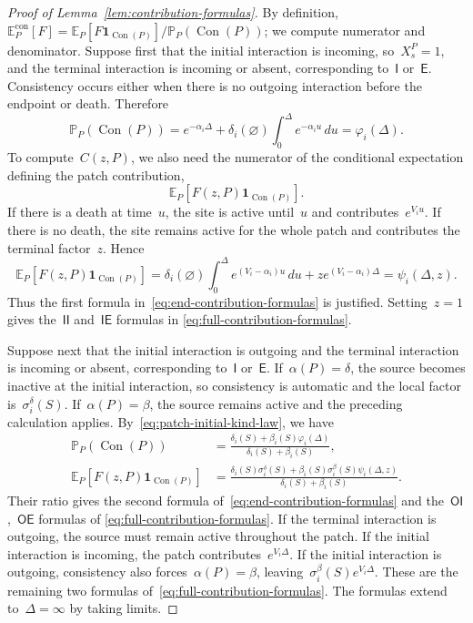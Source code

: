 \documentclass[EJP,preprint,NODS,nobera]{ejpecp}
\newcommand{\pP}{\mathbb{P}}
\newcommand{\E}{\mathbb{E}}
\newcommand{\bb}[1]{\left(#1\right)}
\newcommand{\Cb}[1]{\left[#1\right]}
\newcommand{\ind}{\mathbf{1}}
\begin{document}
\begin{proof}[Proof of Lemma~\ref{lem:contribution-formulas}]
By definition,~$\E_P^{\mathrm{con}}\Cb{F}
=\E_P\Cb{F\ind_{\operatorname{Con}(P)}}/\pP_P\bb{\operatorname{Con}(P)}$; we
compute numerator and denominator.
Suppose first that the initial interaction is incoming, so~$X_s^P=1$, and the terminal interaction is incoming or absent,
corresponding to~$\mathsf I$ or~$\mathsf E$. Consistency occurs either when
there is no outgoing interaction before the endpoint or death. Therefore
\begin{equation*}
\pP_P\bb{\operatorname{Con}(P)}
=
e^{-\alpha_i\Delta}
+
\delta_i(\varnothing)
\int_0^\Delta e^{-\alpha_i u}\,du
=
\varphi_i(\Delta).
\end{equation*}
To compute~$C(z,P)$, we also need the numerator of
the conditional expectation defining the patch contribution,
\begin{equation*}
\E_P\Cb{F(z,P)\ind_{\operatorname{Con}(P)}}.
\end{equation*}
If there is a death at time~$u$, the site is active
until~$u$ and contributes~$e^{V_i u}$. If there is no death,
the site remains active for the whole patch and contributes the terminal
factor~$z$. Hence
\begin{equation*}
\E_P\Cb{F(z,P)\ind_{\operatorname{Con}(P)}}
=
\delta_i(\varnothing)
\int_0^\Delta e^{\bb{V_i-\alpha_i}u}\,du
+
z e^{\bb{V_i-\alpha_i}\Delta}
=
\psi_i(\Delta,z).
\end{equation*}
Thus the first formula in~\eqref{eq:end-contribution-formulas} is justified.
Setting~$z=1$ gives the~$\mathsf{II}$ and~$\mathsf{IE}$ formulas in
\eqref{eq:full-contribution-formulas}.

Suppose next that the initial interaction is outgoing and the
terminal interaction is incoming or absent, corresponding to~$\mathsf I$ or~$\mathsf E$. If~$\alpha(P)=\delta$, the source becomes inactive at
the initial interaction, so consistency is automatic and the local factor
is~$\sigma_i^\delta(S)$. If~$\alpha(P)=\beta$, the source remains active
and the preceding calculation applies. By~\eqref{eq:patch-initial-kind-law},
we have
\begin{align*}
\pP_P\bb{\operatorname{Con}(P)} &= 
\frac{
\delta_i(S)+\beta_i(S)\varphi_i(\Delta)
}{
\delta_i(S)+\beta_i(S)
},\\
\E_P\Cb{F(z,P)\ind_{\operatorname{Con}(P)}} &= \frac{
\delta_i(S)\sigma_i^\delta(S)
+
\beta_i(S)\sigma_i^\beta(S)\psi_i(\Delta,z)
}{
\delta_i(S)+\beta_i(S)
}.
\end{align*}
Their ratio gives the second formula of~\eqref{eq:end-contribution-formulas} and
the~$\mathsf{OI}$,~$\mathsf{OE}$ formulas of
\eqref{eq:full-contribution-formulas}. If the terminal interaction is outgoing, the source must
remain active throughout the patch. If the initial interaction is
incoming, the patch contributes~$e^{V_i\Delta}$. If the initial interaction
is outgoing, consistency also forces~$\alpha(P)=\beta$, leaving~$\sigma_i^\beta(S)e^{V_i\Delta}$. These are the remaining two formulas of~\eqref{eq:full-contribution-formulas}. The formulas extend to~$\Delta=\infty$ by taking limits.
\end{proof}
\end{document}
